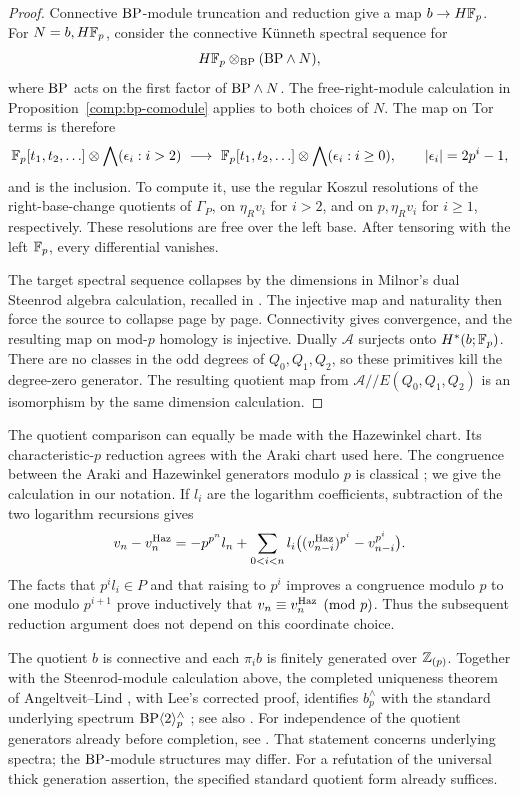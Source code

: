 \begin{proof}
Connective $\mathrm{BP}$-module truncation and reduction give a map
$b\to H\mathbb F_p$. For $N=b,H\mathbb F_p$, consider the connective K\"unneth
spectral sequence for
\[
 H\mathbb F_p\otimes_{\mathrm{BP}}(\mathrm{BP}\wedge N),
\]
where $\mathrm{BP}$ acts on the first factor of $\mathrm{BP}\wedge N$.
The free-right-module calculation in
Proposition~\ref{comp:bp-comodule} applies to both choices of $N$.
The map on Tor terms is therefore
\[
 \mathbb F_p[t_1,t_2,\ldots]\otimes
       \bigwedge(\epsilon_i:i>2)
 \ \longrightarrow\
 \mathbb F_p[t_1,t_2,\ldots]\otimes
       \bigwedge(\epsilon_i:i\geq0),
 \qquad |\epsilon_i|=2p^i-1,
\]
and is the inclusion. To compute it, use the regular Koszul resolutions
of the right-base-change quotients of $\Gamma_P$, on
$\eta_Rv_i$ for $i>2$, and on $p,\eta_Rv_i$ for $i\geq1$,
respectively. These resolutions are free over the left base. After
tensoring with the left $\mathbb F_p$, every differential vanishes.

The target spectral sequence collapses by the dimensions in Milnor's
dual Steenrod algebra calculation, recalled in
\cite[Theorem~3.1.1(b)]{Ravenel1986}.
The injective map and naturality then force the source to collapse
page by page. Connectivity gives convergence, and the resulting map
on mod-$p$ homology is injective. Dually $\mathcal A$ surjects onto
$H^*(b;\mathbb F_p)$. There are no classes in the odd degrees of
$Q_0,Q_1,Q_2$, so these primitives kill the degree-zero generator.
The resulting quotient map from
$\mathcal A//E(Q_0,Q_1,Q_2)$ is an isomorphism by the same dimension
calculation.
\end{proof}

\begin{remark}
\label{comp:forms}
The quotient comparison can equally be made with the Hazewinkel
chart. Its characteristic-$p$ reduction agrees with the Araki chart
used here. The congruence between the Araki and Hazewinkel generators
modulo $p$ is classical \cite[Theorem~A2.2.3]{Ravenel1986}; we give the
calculation in our notation. If $l_i$ are the logarithm coefficients, subtraction
of the two logarithm recursions gives
\[
 v_n-v_n^{\rm Haz}
 =-p^{p^n}l_n+
   \sum_{0<i<n}l_i\bigl((v_{n-i}^{\rm Haz})^{p^i}
                              -v_{n-i}^{p^i}\bigr).
\]
The facts that $p^il_i\in P$ and that raising to $p^i$ improves a
congruence modulo $p$ to one modulo $p^{i+1}$ prove inductively that
$v_n\equiv v_n^{\rm Haz}\pmod p$. Thus the subsequent reduction
argument does not depend on this coordinate choice.

The quotient $b$ is connective and each $\pi_i b$ is finitely generated
over $\mathbb Z_{(p)}$. Together with the Steenrod-module calculation above,
the completed uniqueness theorem of Angeltveit--Lind \cite{AL2017},
with Lee's corrected proof, identifies $b_p^\wedge$ with the standard
underlying spectrum $\mathrm{BP}\langle2\rangle_p^\wedge$
\cite[Theorem~1.1 and Remark~1.4]{Lee2026}; see also
\cite[Note~2]{LP2026}. For independence of the quotient generators
already before completion, see \cite[Corollary~1.9]{Lee2026}. That
statement concerns underlying spectra; the $\mathrm{BP}$-module structures
may differ. For a refutation of the universal thick generation
assertion, the specified standard quotient form already suffices.
\end{remark}

